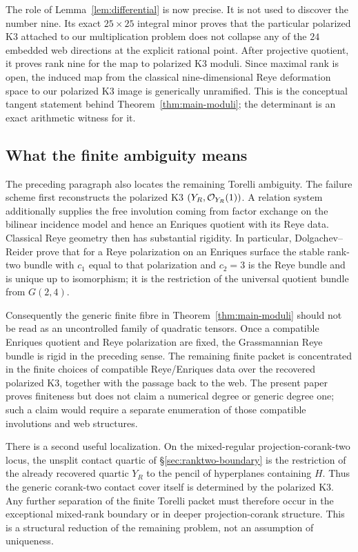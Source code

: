 The role of Lemma~\ref{lem:differential} is now precise.  It is not
used to discover the number nine.  Its exact $25\times25$ integral
minor proves that the particular polarized K3 attached to our
multiplication problem does not collapse any of the $24$ embedded
web directions at the explicit rational point.  After projective
quotient, it proves rank nine for the map to polarized K3 moduli.
Since maximal rank is open, the induced map from the classical
nine-dimensional Reye deformation space to our polarized K3 image is
generically unramified.  This is the conceptual tangent statement
behind Theorem~\ref{thm:main-moduli}; the determinant is an exact
arithmetic witness for it.

\subsection{What the finite ambiguity means}

The preceding paragraph also locates the remaining Torelli ambiguity.
The failure scheme first reconstructs the polarized K3
$(Y_R,\mathcal O_{Y_R}(1))$.  A relation system additionally supplies the
free involution coming from factor exchange on the bilinear incidence
model and hence an Enriques quotient with its Reye data.  Classical
Reye geometry then has substantial rigidity.  In particular,
Dolgachev--Reider prove that for a Reye polarization on an Enriques
surface the stable rank-two bundle with
$c_1$ equal to that polarization and $c_2=3$ is the Reye bundle and
is unique up to isomorphism; it is the restriction of the universal
quotient bundle from $G(2,4)$.

Consequently the generic finite fibre in
Theorem~\ref{thm:main-moduli} should not be read as an uncontrolled
family of quadratic tensors.  Once a compatible Enriques quotient and
Reye polarization are fixed, the Grassmannian Reye bundle is rigid in
the preceding sense.  The remaining finite packet is concentrated in
the finite choices of compatible Reye/Enriques data over the recovered
polarized K3, together with the passage back to the web.  The present
paper proves finiteness but does not claim a numerical degree or
generic degree one; such a claim would require a separate enumeration
of those compatible involutions and web structures.

There is a second useful localization.  On the mixed-regular
projection-corank-two locus, the unsplit contact quartic of
\S\ref{sec:ranktwo-boundary} is the restriction of the already
recovered quartic $Y_R$ to the pencil of hyperplanes containing $H$.
Thus the generic corank-two contact cover itself is determined by the
polarized K3.  Any further separation of the finite Torelli packet
must therefore occur in the exceptional mixed-rank boundary or in
deeper projection-corank structure.  This is a structural reduction
of the remaining problem, not an assumption of uniqueness.

